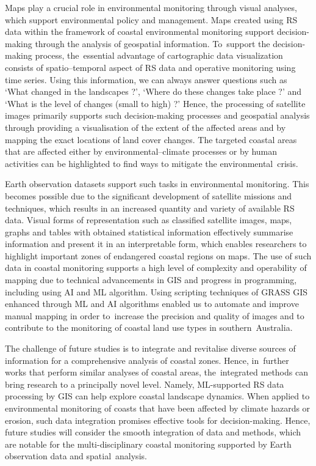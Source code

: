 \documentclass[jmse,article,accept,pdftex,oneauthor]{Definitions/mdpi}
\begin{document}
Maps play a crucial role in environmental monitoring through visual analyses, which support environmental policy and management. Maps created using RS data within the framework of coastal environmental monitoring support decision-making through the analysis of geospatial information. To~support {the }decision-making process, the~essential advantage of cartographic data visualization consists of spatio--temporal aspect of RS data and operative monitoring using time series. Using this information, we can always answer questions such as `What changed in the landscapes ?', `Where do these changes take place ?' and `What is the level of changes (small to {high}) ?' Hence, the processing of satellite images primarily {supports} such decision-making {processes }and geospatial analysis through providing a visualisation of the extent of the affected areas and by mapping the exact locations of land cover changes. The targeted coastal areas that are affected either by environmental--climate processes or by human activities can be highlighted to find ways to mitigate the environmental~crisis. 

Earth observation datasets support such tasks in environmental monitoring. This becomes possible due to the significant development of satellite missions and techniques, which results in an increased quantity and variety of available RS data. Visual forms of representation such as classified satellite images, maps, graphs and tables with obtained statistical information effectively summarise information and present it in an interpretable form, which enables researchers %
to highlight important zones of endangered coastal regions on maps. The use of such data in coastal monitoring supports a high level of complexity and operability of mapping due to technical advancements in GIS and progress in programming, including using AI and ML algorithm. Using scripting techniques of GRASS GIS enhanced through ML and AI algorithms enabled us to automate and improve manual mapping in order to~increase the precision and quality of images and to contribute to the monitoring of coastal land use types in southern~Australia. 

The challenge of future studies is to integrate and revitalise diverse sources of information for a comprehensive analysis of coastal zones. Hence, in~further works that perform similar analyses of coastal areas, the~integrated methods can bring research to a principally novel level. Namely, ML-supported RS data processing by GIS can help explore coastal landscape dynamics. When applied to environmental monitoring of coasts that have been affected by climate hazards or erosion, such data integration promises effective tools for decision-making. Hence, future studies will consider the smooth integration of data and methods, which are notable for the multi-disciplinary coastal monitoring supported by Earth observation data and spatial~analysis. 
\end{document}
